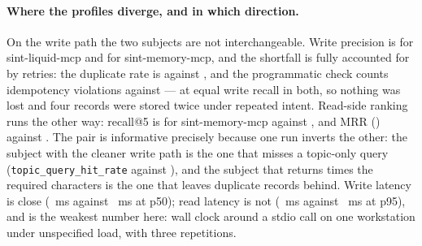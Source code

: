 \documentclass[11pt,a4paper]{article}
\begin{document}
\paragraph{Where the profiles diverge, and in which direction.} On the write path the two
subjects are not interchangeable. Write precision is  for
sint-liquid-mcp and  for sint-memory-mcp, and the shortfall is
fully accounted for by retries: the duplicate rate is  against
, and the programmatic check counts
 idempotency violations against
 --- at equal write recall  in
both, so nothing was lost and four records were stored twice under repeated intent. Read-side
ranking runs the other way: recall@5 is  for sint-memory-mcp against
, and MRR  () against
. The pair is informative precisely because one run inverts the other: the
subject with the cleaner write path is the one that misses a topic-only query
(\texttt{topic\_query\_hit\_rate}  against
), and the subject that returns
 times the required characters is the one that leaves duplicate
records behind. Write latency is close (~ms against
~ms at p50); read latency is not
(~ms against ~ms at p95),
and is the weakest number here: wall clock around a stdio call on one workstation under
unspecified load, with three repetitions.
\end{document}
